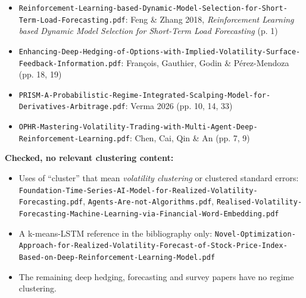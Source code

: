 \documentclass{article}
\begin{document}
\begin{itemize}

\item \texttt{Reinforcement-\allowbreak{}Learning-\allowbreak{}based-\allowbreak{}Dynamic-\allowbreak{}Model-\allowbreak{}Selection-\allowbreak{}for-\allowbreak{}Short-\allowbreak{}Term-\allowbreak{}Load-\allowbreak{}Forecasting.\allowbreak{}pdf}: Feng \& Zhang 2018, \emph{Reinforcement Learning based Dynamic Model Selection for Short-Term Load Forecasting} (p. 1)

\item \texttt{Enhancing-\allowbreak{}Deep-\allowbreak{}Hedging-\allowbreak{}of-\allowbreak{}Options-\allowbreak{}with-\allowbreak{}Implied-\allowbreak{}Volatility-\allowbreak{}Surface-\allowbreak{}Feedback-\allowbreak{}Information.\allowbreak{}pdf}: François, Gauthier, Godin \& Pérez-Mendoza (pp. 18, 19)

\item \texttt{PRISM-\allowbreak{}A-\allowbreak{}Probabilistic-\allowbreak{}Regime-\allowbreak{}Integrated-\allowbreak{}Scalping-\allowbreak{}Model-\allowbreak{}for-\allowbreak{}Derivatives-\allowbreak{}Arbitrage.\allowbreak{}pdf}: Verma 2026 (pp. 10, 14, 33)

\item \texttt{OPHR-\allowbreak{}Mastering-\allowbreak{}Volatility-\allowbreak{}Trading-\allowbreak{}with-\allowbreak{}Multi-\allowbreak{}Agent-\allowbreak{}Deep-\allowbreak{}Reinforcement-\allowbreak{}Learning.\allowbreak{}pdf}: Chen, Cai, Qin \& An (pp. 7, 9)

\end{itemize}

\textbf{Checked, no relevant clustering content:}

\begin{itemize}

\item Uses of ``cluster'' that mean \emph{volatility clustering} or clustered standard errors: \texttt{Foundation-\allowbreak{}Time-\allowbreak{}Series-\allowbreak{}AI-\allowbreak{}Model-\allowbreak{}for-\allowbreak{}Realized-\allowbreak{}Volatility-\allowbreak{}Forecasting.\allowbreak{}pdf}, \texttt{Agents-\allowbreak{}Are-\allowbreak{}not-\allowbreak{}Algorithms.\allowbreak{}pdf}, \texttt{Realised-\allowbreak{}Volatility-\allowbreak{}Forecasting-\allowbreak{}Machine-\allowbreak{}Learning-\allowbreak{}via-\allowbreak{}Financial-\allowbreak{}Word-\allowbreak{}Embedding.\allowbreak{}pdf}

\item A k-means-LSTM reference in the bibliography only: \texttt{Novel-\allowbreak{}Optimization-\allowbreak{}Approach-\allowbreak{}for-\allowbreak{}Realized-\allowbreak{}Volatility-\allowbreak{}Forecast-\allowbreak{}of-\allowbreak{}Stock-\allowbreak{}Price-\allowbreak{}Index-\allowbreak{}Based-\allowbreak{}on-\allowbreak{}Deep-\allowbreak{}Reinforcement-\allowbreak{}Learning-\allowbreak{}Model.\allowbreak{}pdf}

\item The remaining deep hedging, forecasting and survey papers have no regime clustering.

\end{itemize}
\end{document}
